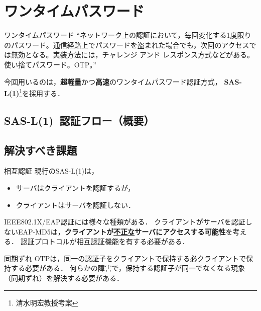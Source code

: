 \section{ワンタイムパスワード}
\toc
\begin{frame}[c]{\fft}
    \begin{block}{ワンタイムパスワード}
        ``ネットワーク上の認証において，毎回変化する1度限りのパスワード。通信経路上でパスワードを盗まれた場合でも，次回のアクセスでは無効となる。実装方法には，チャレンジ アンド レスポンス方式などがある。使い捨てパスワード。OTP。''
    \end{block}
    \vfill
    今回用いるのは，\textbf{超軽量}かつ\textbf{高速}のワンタイムパスワード認証方式，\textbf{\color{red} SAS-L(1)}\footnote{清水明宏教授考案}を採用する．
\end{frame}
\subsection{SAS-L(1)\ 認証フロー（概要）}
\begin{frame}{\ft}
    
\end{frame}
\subsection{解決すべき課題}
\begin{frame}[t]{\ft}
    \begin{alertblock}{相互認証\hfill\textbf{}}
        現行のSAS-L(1)は，
        \begin{itemize}
            \item サーバはクライアントを認証するが，
            \item クライアントはサーバを認証しない．
        \end{itemize}
        IEEE802.1X/EAP認証には様々な種類がある．
        クライアントがサーバを認証しないEAP-MD5は，\textbf{クライアントが\underline{不正な}サーバにアクセスする可能性}を考える．
        認証プロトコルが相互認証機能を有する必要がある．
    \end{alertblock}
    \begin{alertblock}{同期ずれ\hfill\textbf{}}
        OTPは，同一の認証子をクライアントで保持する必クライアントで保持する必要がある．
        何らかの障害で，保持する認証子が同一でなくなる現象（同期ずれ）を解決する必要がある．
    \end{alertblock}
\end{frame}